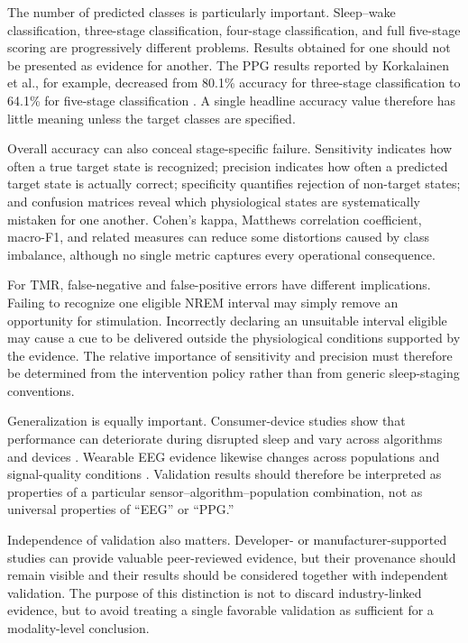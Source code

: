 The number of predicted classes is particularly important. Sleep--wake
classification, three-stage classification, four-stage classification, and
full five-stage scoring are progressively different problems. Results obtained
for one should not be presented as evidence for another. The PPG results
reported by Korkalainen et al., for example, decreased from 80.1\% accuracy for
three-stage classification to 64.1\% for five-stage classification
\citep{korkalainen2020ppg}. A single headline accuracy value therefore has
little meaning unless the target classes are specified.

Overall accuracy can also conceal stage-specific failure. Sensitivity indicates
how often a true target state is recognized; precision indicates how often a
predicted target state is actually correct; specificity quantifies rejection of
non-target states; and confusion matrices reveal which physiological states are
systematically mistaken for one another. Cohen's kappa, Matthews correlation
coefficient, macro-F1, and related measures can reduce some distortions caused
by class imbalance, although no single metric captures every operational
consequence.

For TMR, false-negative and false-positive errors have different implications.
Failing to recognize one eligible NREM interval may simply remove an opportunity
for stimulation. Incorrectly declaring an unsuitable interval eligible may
cause a cue to be delivered outside the physiological conditions supported by
the evidence. The relative importance of sensitivity and precision must
therefore be determined from the intervention policy rather than from generic
sleep-staging conventions.

Generalization is equally important. Consumer-device studies show that
performance can deteriorate during disrupted sleep and vary across algorithms
and devices \citep{chinoy2021consumer}. Wearable EEG evidence likewise changes
across populations and signal-quality conditions
\citep{arnal2020dreem,ravindran2025dreem}. Validation results should therefore
be interpreted as properties of a particular sensor--algorithm--population
combination, not as universal properties of ``EEG'' or ``PPG.''

Independence of validation also matters. Developer- or manufacturer-supported
studies can provide valuable peer-reviewed evidence, but their provenance should
remain visible and their results should be considered together with independent
validation. The purpose of this distinction is not to discard industry-linked
evidence, but to avoid treating a single favorable validation as sufficient for
a modality-level conclusion.


